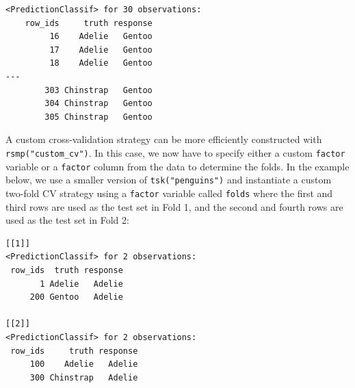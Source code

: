 \begin{verbatim}
<PredictionClassif> for 30 observations:
    row_ids     truth response
         16    Adelie   Gentoo
         17    Adelie   Gentoo
         18    Adelie   Gentoo
---                           
        303 Chinstrap   Gentoo
        304 Chinstrap   Gentoo
        305 Chinstrap   Gentoo
\end{verbatim}

A custom cross-validation strategy can be more efficiently constructed
with \texttt{rsmp("custom\_cv")}. In this case, we now have to specify
either a custom \texttt{factor} variable or a \texttt{factor} column
from the data to determine the folds. In the example below, we use a
smaller version of \texttt{tsk("penguins")} and instantiate a custom
two-fold CV strategy using a \texttt{factor} variable called
\texttt{folds} where the first and third rows are used as the test set
in Fold 1, and the second and fourth rows are used as the test set in
Fold 2:

\begin{Shaded}
\begin{Highlighting}[]
\OtherTok{=} \NormalTok{(}\NormalTok{)}\SpecialCharTok{$}\NormalTok{(}\NormalTok{(}\NormalTok{, }\NormalTok{, }\NormalTok{, }\NormalTok{))}
\OtherTok{=} \NormalTok{(}\NormalTok{)}
\OtherTok{=} \NormalTok{(}\NormalTok{(}\NormalTok{, }\NormalTok{, }\NormalTok{, }\NormalTok{))}
\SpecialCharTok{$}
\SpecialCharTok{$}\NormalTok{()}
\end{Highlighting}
\end{Shaded}

\begin{verbatim}
[[1]]
<PredictionClassif> for 2 observations:
 row_ids  truth response
       1 Adelie   Adelie
     200 Gentoo   Adelie

[[2]]
<PredictionClassif> for 2 observations:
 row_ids     truth response
     100    Adelie   Adelie
     300 Chinstrap   Adelie
\end{verbatim}

